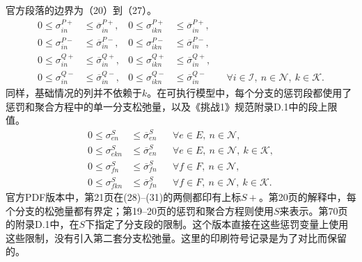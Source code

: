 \documentclass{article}
\begin{document}
官方段落的边界为（20）到（27）。
\begin{align*}
0\leq\sigma_{in}^{P+}&\leq\overline\sigma_{in}^{P+},&
0\leq\sigma_{ikn}^{P+}&\leq\overline\sigma_{in}^{P+},\\
0\leq\sigma_{in}^{P-}&\leq\overline\sigma_{in}^{P-},&
0\leq\sigma_{ikn}^{P-}&\leq\overline\sigma_{in}^{P-},\\
0\leq\sigma_{in}^{Q+}&\leq\overline\sigma_{in}^{Q+},&
0\leq\sigma_{ikn}^{Q+}&\leq\overline\sigma_{in}^{Q+},\\
0\leq\sigma_{in}^{Q-}&\leq\overline\sigma_{in}^{Q-},&
0\leq\sigma_{ikn}^{Q-}&\leq\overline\sigma_{in}^{Q-}
&&\forall i\in\mathcal I,\ n\in\mathcal N,\ k\in\mathcal K.
\end{align*}
同样，基础情况的列并不依赖于$k$。在可执行模型中，每个分支的惩罚段都使用了惩罚和聚合方程中的单一分支松弛量，以及《挑战1》规范附录D.1中的段上限值。
\begin{align*}
0\leq\sigma_{en}^{S}&\leq\overline\sigma_{en}^{S}
&&\forall e\in E,\ n\in\mathcal N,\\
0\leq\sigma_{ekn}^{S}&\leq\overline\sigma_{en}^{S}
&&\forall e\in E,\ n\in\mathcal N,\ k\in\mathcal K,\\
0\leq\sigma_{fn}^{S}&\leq\overline\sigma_{fn}^{S}
&&\forall f\in F,\ n\in\mathcal N,\\
0\leq\sigma_{fkn}^{S}&\leq\overline\sigma_{fn}^{S}
&&\forall f\in F,\ n\in\mathcal N,\ k\in\mathcal K.
\end{align*}
官方PDF版本中，第21页在(28)--(31)的两侧都印有上标$S+$。第20页的解释中，每个分支的松弛量都有界定；第19--20页的惩罚和聚合方程则使用$S$来表示。第70页的附录D.1中，在$S$下指定了分支段的限制。这个版本直接在这些惩罚变量上使用这些限制，没有引入第二套分支松弛量。这里的印刷符号记录是为了对比而保留的。
\end{document}

